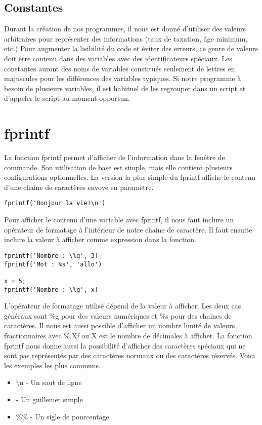 \documentclass{tufte-handout}
\begin{document}
\subsection{Constantes}
Durant la création de nos programmes, il nous est donné d'utiliser des valeurs arbitraires pour représenter des informations (taux de taxation, âge minimum, etc.) Pour augmenter la lisibilité du code et éviter des erreurs, ce genre de valeurs doit être contenu dans des variables avec des identificateurs spéciaux. Les constantes auront des noms de variables constitués seulement de lettres en majuscules pour les différences des variables typiques.
Si notre programme à besoin de plusieurs variables, il est habituel de les regrouper dans un script et d'appeler le script au moment opportun.

\section{fprintf}
La fonction fprintf permet d'afficher de l'information dans la fenêtre de commande. Son utilisation de base est simple, mais elle contient plusieurs configurations optionnelles.
La version la plus simple du fprintf affiche le contenu d'une chaine de caractères envoyé en paramètre.
\begin{lstlisting}[title={Simple fprintf}]
fprintf('Bonjour la vie!\n')
\end{lstlisting}
Pour afficher le contenu d'une variable avec fprintf, il nous faut inclure un opérateur de formatage à l'intérieur de notre chaine de caractère. Il faut ensuite inclure la valeur à afficher comme expression dans la fonction.
\begin{lstlisting}[title={fprintf avec opérateur de formatage}]
fprintf('Nombre : \%g', 3)
fprintf('Mot : %s', 'allo')

x = 5;
fprintf('Nombre : \%g', x)
\end{lstlisting}
L'opérateur de formatage utilisé dépend de la valeur à afficher. Les deux cas généraux sont \%g pour des valeurs numériques et \%s pour des chaines de caractères. Il nous est aussi possible d'afficher un nombre limité de valeurs fractionnaires avec \%.Xf ou X est le nombre de décimales à afficher.
La fonction fprintf nous donne aussi la possibilité d'afficher des caractères spéciaux qui ne sont pas représentés par des caractères normaux ou des caractères réservés. Voici les exemples les plus communs.
\begin{itemize}
    \item \textbackslash{}n - Un saut de ligne
    \item \textquotesingle\textquotesingle - Un guillemet simple
    \item \%\% - Un sigle de pourcentage
\end{itemize}
\end{document}
